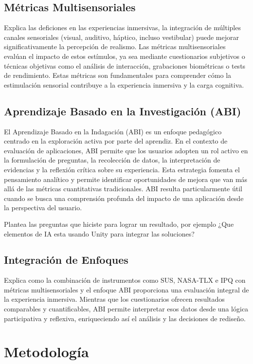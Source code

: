 \documentclass[12pt]{article}
\begin{document}
\subsection{Métricas Multisensoriales}
Explica las deficiones en las experiencias inmersivas, la integración de múltiples canales sensoriales (visual, auditivo, háptico, incluso vestibular) puede mejorar significativamente la percepción de realismo. Las métricas multisensoriales evalúan el impacto de estos estímulos, ya sea mediante cuestionarios subjetivos o técnicas objetivas como el análisis de interacción, grabaciones biométricas o tests de rendimiento. Estas métricas son fundamentales para comprender cómo la estimulación sensorial contribuye a la experiencia inmersiva y la carga cognitiva.

\subsection{Aprendizaje Basado en la Investigación (ABI)}
El Aprendizaje Basado en la Indagación (ABI) es un enfoque pedagógico centrado en la exploración activa por parte del aprendiz. En el contexto de evaluación de aplicaciones, ABI permite que los usuarios adopten un rol activo en la formulación de preguntas, la recolección de datos, la interpretación de evidencias y la reflexión crítica sobre su experiencia. Esta estrategia fomenta el pensamiento analítico y permite identificar oportunidades de mejora que van más allá de las métricas cuantitativas tradicionales. ABI resulta particularmente útil cuando se busca una comprensión profunda del impacto de una aplicación desde la perspectiva del usuario.

Plantea las preguntas que hiciste para lograr un resultado, por ejemplo ¿Que elementos de IA esta usando Unity para integrar las soluciones?

\subsection{Integración de Enfoques}
Explica como la combinación de instrumentos como SUS, NASA-TLX e IPQ con métricas multisensoriales y el enfoque ABI proporciona una evaluación integral de la experiencia inmersiva. Mientras que los cuestionarios ofrecen resultados comparables y cuantificables, ABI permite interpretar esos datos desde una lógica participativa y reflexiva, enriqueciendo así el análisis y las decisiones de rediseño.



\section{Metodología}
\end{document}
